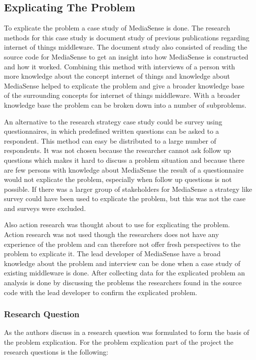 \subsection{Explicating The Problem}
To explicate the problem a case study of MediaSense is done. The research methods for this case study is document study of previous publications regarding internet of things middleware. The document study also consisted of reading the source code for MediaSense to get an insight into how MediaSense is constructed and how it worked. Combining this method with interviews of a person with more knowledge about the concept internet of things and knowledge about MediaSense helped to explicate the problem and give a broader knowledge base of the surrounding concepts for internet of things middleware. With a broader knowledge base the problem can be broken down into a number of subproblems. 

An alternative to the research strategy case study could be survey using questionnaires, in which predefined written questions can be asked to a respondent. This method can easy be distributed to a large number of respondents. It was not chosen because the researcher cannot ask follow up questions which makes it hard to discuss a problem situation and because there are few persons with knowledge about MediaSense the result of a questionnaire would not explicate the problem, especially when follow up questions is not possible. If there was a larger group of stakeholders for MediaSense a strategy like survey could have been used to explicate the problem, but this was not the case and surveys were excluded.

Also action research was thought about to use for explicating the problem. Action research was not used though the researchers does not have any experience of the problem and can therefore not offer fresh perspectives to the problem to explicate it. The lead developer of MediaSense have a broad knowledge about the problem and interview can be done when a case study of existing middleware is done. After collecting data for the explicated problem an analysis is done by discussing the problems the researchers found in the source code with the lead developer to confirm the explicated problem. 

\subsubsection{Research Question}
As the authors discuss in \cite{johannesson2012design} a research question was formulated to form the basis of the problem explication. For the problem explication part of the project the research questions is the following: 


